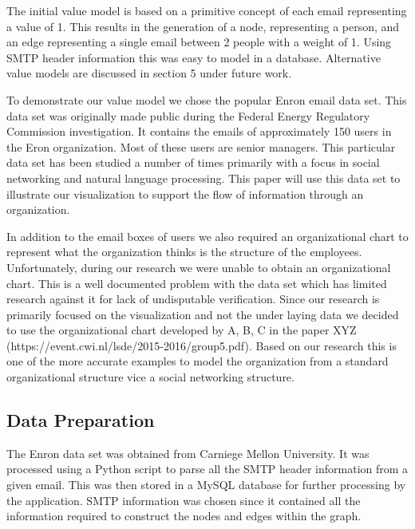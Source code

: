 \documentclass[journal]{vgtc}                %
\begin{document}
The initial value model is based on a primitive concept of each email representing a value of 1.  This results in the generation of a node, representing a person, and an edge representing a single email between 2 people with a weight of 1.  Using SMTP header information this was easy to model in a database.  Alternative value models are discussed in section 5 under future work.

To demonstrate our value model we chose the popular Enron email data set.  This data set was originally made public during the Federal Energy Regulatory Commission investigation.  It contains the emails of approximately 150 users in the Eron organization.  Most of these users are senior managers.  This particular data set has been studied a number of times primarily with a focus in social networking and natural language processing.  This paper will use this data set to illustrate our visualization to support the flow of information through an organization.  

In addition to the email boxes of users we also required an organizational chart to represent what the organization thinks is the structure of the employees.  Unfortunately, during our research we were unable to obtain an organizational chart.  This is a well documented problem with the data set which has limited research against it for lack of undisputable verification.  Since our research is primarily focused on the visualization and not the under laying data we decided to use the organizational chart developed by A, B, C in the paper XYZ (https://event.cwi.nl/lsde/2015-2016/group5.pdf).  Based on our research this is one of the more accurate examples to model the organization from a standard organizational structure vice a social networking structure.

\subsection{Data Preparation}

The Enron data set was obtained from Carniege Mellon University.  It was processed using a Python script to parse all the SMTP header information from a given email.  This was then stored in a MySQL database for further processing by the application.  SMTP information was chosen since it contained all the information required to construct the nodes and edges within the graph.  
\end{document}
